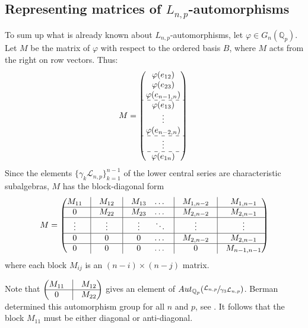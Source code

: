 \documentclass[12pt]{article}
\begin{document}
\subsection{Representing matrices of $L_{n,p}$-automorphisms}
To sum up what is already known about $L_{n,p}$-automorphisms, let $\varphi\in{G_{n}}(\mathbb{Q}_p)$. Let $M$ be the matrix of $\varphi$ with respect to the ordered basis $B$, where $M$ acts from the right on row vectors.  Thus:
\[
M=\begin{pmatrix}
\varphi(e_{12})\\
\varphi(e_{23})\\
\varphi(e_{n-1,n})\\
\hdashline
\varphi(e_{13})\\
\vdots\\
\varphi(e_{n-2,n})\\
\hdashline
\vdots\\
\hdashline
\varphi(e_{1n})\\
\end{pmatrix}\\
\]
Since the elements $\{\gamma_{k}\mathcal{L}_{n,p}\}_{k=1}^{n-1}$ of the lower central series are characteristic subalgebras, $M$ has the block-diagonal form
\[M=\begin{pmatrix}
M_{11}&\vline&M_{12}&\vline& M_{13}
&\dots&\vline&M_{1,n-2}&\vline&M_{1,n-1}\\
\hline
0&\vline&M_{22}&\vline&M_{23}&\dots&\vline 
&M_{2,n-2} &\vline& M_{2,n-1}\\
\hline
\vdots & \vline & \vdots&\vline & \vdots & \ddots &\vline & \vdots &\vline& \vdots\\
\hline
0 & \vline & 0&\vline & 0 & \dots &\vline & M_{2,n-2} &\vline& M_{2,n-1}\\
\hline
0 & \vline & 0 &\vline & 0 & \dots &\vline & 0 &\vline& M_{n-1,n-1}\\
\end{pmatrix}
\]
where each block $M_{ij}$ is an $(n-i)\times{(n-j)}$ matrix.\par
Note that $\begin{pmatrix}
M_{11} & \vline & M_{12}\\
\hline
0 & \vline & M_{22}\\
\end{pmatrix}$ gives an element of $Aut_{\mathbb{Q}_{p}}(\sfrac{\mathcal{L}_{n,p}}{\gamma_{3}\mathcal{L}_{n,p}})$. Berman determined this automorphism group for all $n$ and $p$, see \cite[Prop. 3.6]{Berman}. It follows that the block $M_{11}$ must be either diagonal or anti-diagonal.
\end{document}
